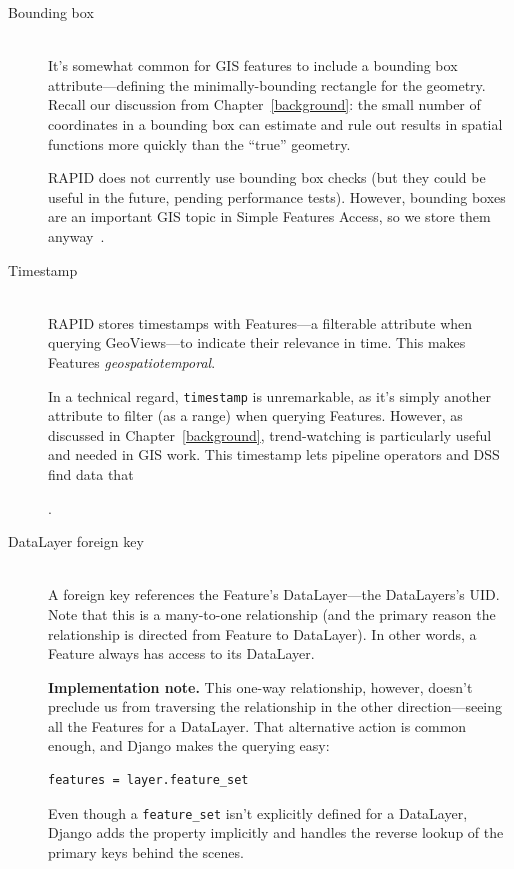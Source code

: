 \begin{description}
\item[Bounding box] \hfill \\
  It's somewhat common for GIS features to include a bounding box attribute---defining the minimally-bounding rectangle for the geometry. Recall our discussion from Chapter~\ref{background}: the small number of coordinates in a bounding box can estimate and rule out results in spatial functions more quickly than the ``true'' geometry.

  RAPID does not currently use bounding box checks (but they could be useful in the future, pending performance tests). However, bounding boxes are an important GIS topic in Simple Features Access, so we store them anyway~\cite{SFA}.
  
\item[Timestamp] \hfill \\
RAPID stores timestamps with Features---a filterable attribute when querying GeoViews---to indicate their relevance in time. This makes Features \textit{geospatiotemporal}.

In a technical regard, \texttt{timestamp} is unremarkable, as it's simply another attribute to filter (as a range) when querying Features. However, as discussed in Chapter~\ref{background}, trend-watching is particularly useful and needed in GIS work. This timestamp lets pipeline operators and DSS find data that .
  
\item[DataLayer foreign key] \hfill \\
A foreign key references the Feature's DataLayer---the DataLayers's UID. Note that this is a many-to-one relationship (and the primary reason the relationship is directed from Feature to DataLayer). In other words, a Feature always has access to its DataLayer.

\textbf{Implementation note.} This one-way relationship, however, doesn't preclude us from traversing the relationship in the other direction---seeing all the Features for a DataLayer. That alternative action is common enough, and Django makes the querying easy: 

\begin{Verbatim}[samepage=true,baselinestretch=1,xleftmargin=12mm]
features = layer.feature_set
\end{Verbatim}

Even though a \texttt{feature\_set} isn't explicitly defined for a DataLayer, Django adds the property implicitly and handles the reverse lookup of the primary keys behind the scenes.

\end{description}

